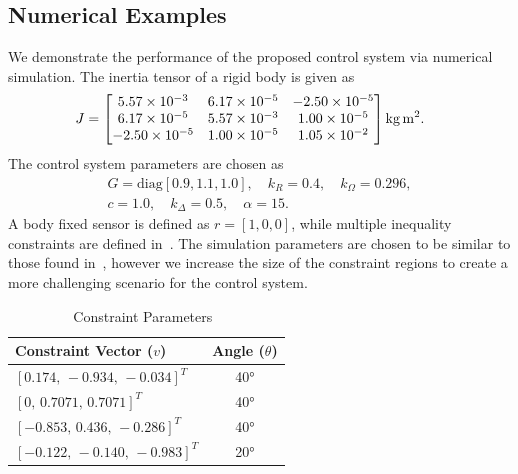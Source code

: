 \documentclass[fleqn]{IJCAS}  %
\begin{document}
\begin{multicols}{2}
\section{Numerical Examples}
We demonstrate the performance of the proposed control system via numerical simulation.
The inertia tensor of a rigid body is given as
\begin{gather*}
  \hspace{-5mm}
	J = \begin{bmatrix}
	\num{5.57e-3} & \num{6.17e-5} & \num{-2.50e-5} \\
	\num{6.17e-5} & \num{5.57e-3} & \num{1.00e-5} \\
	\num{-2.50e-5} & \num{1.00e-5} & \num{1.05e-2}
	\end{bmatrix} \si{\kilo\gram\meter\squared} .
\end{gather*} 
The control system parameters are chosen as
\begin{gather*}
	G = \text{diag} [0.9,1.1,1.0], \quad k_R = 0.4 , \quad	k_\Omega = 0.296 ,\\
	c = 1.0 , \quad k_\Delta = 0.5 , \quad \alpha = 15 .
\end{gather*}
A body fixed sensor is defined as \(r = [1,0,0]\), while multiple inequality constraints are defined in~.
The simulation parameters are chosen to be similar to those found in~\cite{lee2011b}, however we increase the size of the constraint regions to create a more challenging scenario for the control system.
\begin{table}[H]
\caption{Constraint Parameters~\label{tab:constraints}}
\begin{center}\begin{tabular}{lc}
Constraint Vector (\( v \)) & Angle (\( \theta \)) \\ \hline \hline 
\([0.174,\,-0.934,\, -0.034]^T\) & \ang{40} \\ \hline 
\([0 ,\, 0.7071 ,\, 0.7071]^T\) & \ang{40} \\ \hline 
\([-0.853 ,\, 0.436 ,\, -0.286]^T\) & \ang{40} \\ \hline 
\([-0.122 ,\,-0.140,\, -0.983]^T\) & \ang{20}\end{tabular} 
\end{center}
\end{table}


\end{multicols}
\end{document}
